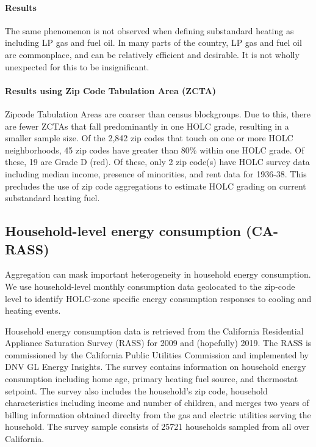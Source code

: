 \documentclass[
]{article}
\begin{document}
\hypertarget{results-1}{%
\paragraph{Results}\label{results-1}}

The same phenomenon is not observed when defining substandard heating as
including LP gas and fuel oil. In many parts of the country, LP gas and
fuel oil are commonplace, and can be relatively efficient and desirable.
It is not wholly unexpected for this to be insignificant.

\hypertarget{results-using-zip-code-tabulation-area-zcta}{%
\paragraph{Results using Zip Code Tabulation Area
(ZCTA)}\label{results-using-zip-code-tabulation-area-zcta}}

Zipcode Tabulation Areas are coarser than census blockgroups. Due to
this, there are fewer ZCTAs that fall predominantly in one HOLC grade,
resulting in a smaller sample size. Of the 2,842 zip codes that touch on
one or more HOLC neighborhoods, 45 zip codes have greater than 80\%
within one HOLC grade. Of these, 19 are Grade D (red). Of these, only 2
zip code(s) have HOLC survey data including median income, presence of
minorities, and rent data for 1936-38. This precludes the use of zip
code aggregations to estimate HOLC grading on current substandard
heating fuel.

\hypertarget{household-level-energy-consumption-ca-rass}{%
\subsection{Household-level energy consumption
(CA-RASS)}\label{household-level-energy-consumption-ca-rass}}

Aggregation can mask important heterogeneity in household energy
consumption. We use household-level monthly consumption data geolocated
to the zip-code level to identify HOLC-zone specific energy consumption
responses to cooling and heating events.

Household energy consumption data is retrieved from the California
Residential Appliance Saturation Survey (RASS) for 2009 and (hopefully)
2019. The RASS is commissioned by the California Public Utilities
Commission and implemented by DNV GL Energy Insights. The survey
contains information on household energy consumption including home age,
primary heating fuel source, and thermostat setpoint. The survey also
includes the household's zip code, household characteristics including
income and number of children, and merges two years of billing
information obtained direclty from the gas and electric utilities
serving the household. The survey sample consists of 25721 households
sampled from all over California.
\end{document}
